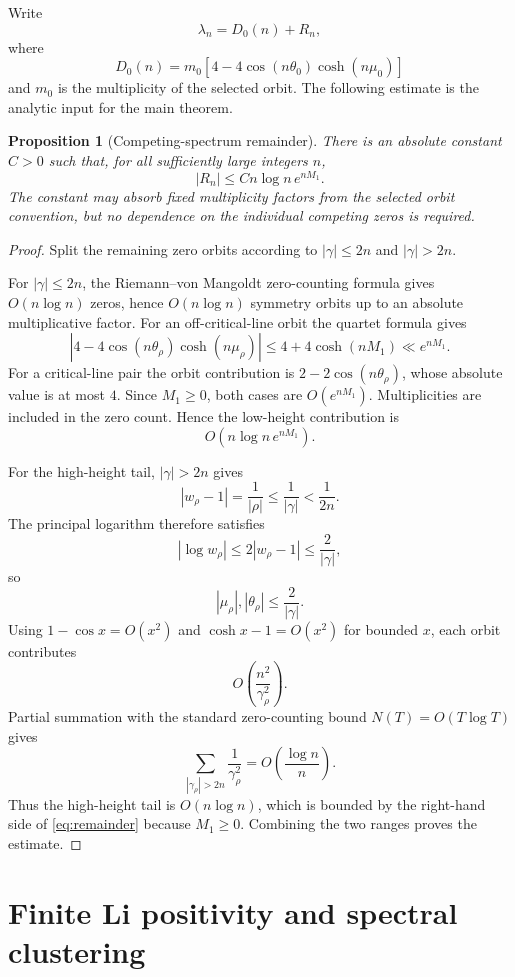 \documentclass[11pt]{article}
\newtheorem{proposition}[theorem]{Proposition}
\newcommand{\Li}{\lambda}
\begin{document}
Write
\[
\Li_n=D_0(n)+R_n,
\]
where
\[
D_0(n)=m_0\left[4-4\cos(n\theta_0)\cosh(n\mu_0)\right]
\]
and \(m_0\) is the multiplicity of the selected orbit. The following estimate is the analytic input for the main theorem.

\begin{proposition}[Competing-spectrum remainder]
\label{prop:remainder}
There is an absolute constant \(C>0\) such that, for all sufficiently large integers \(n\),
\begin{equation}
|R_n|
\le C n\log n\,e^{nM_1}.
\label{eq:remainder}
\end{equation}
The constant may absorb fixed multiplicity factors from the selected orbit convention, but no dependence on the individual competing zeros is required.
\end{proposition}

\begin{proof}
Split the remaining zero orbits according to \(|\gamma|\le2n\) and \(|\gamma|>2n\).

For $|\gamma|\le2n$, the Riemann--von Mangoldt zero-counting formula gives $O(n\log n)$ zeros, hence $O(n\log n)$ symmetry orbits up to an absolute multiplicative factor. For an off-critical-line orbit the quartet formula gives
\[
\left|4-4\cos(n\theta_\rho)\cosh(n\mu_\rho)\right|
\le4+4\cosh(nM_1)
\ll e^{nM_1}.
\]
For a critical-line pair the orbit contribution is $2-2\cos(n\theta_\rho)$, whose absolute value is at most $4$. Since $M_1\ge0$, both cases are $O(e^{nM_1})$. Multiplicities are included in the zero count. Hence the low-height contribution is
\[
O\left(n\log n\,e^{nM_1}\right).
\]

For the high-height tail, \(|\gamma|>2n\) gives
\[
|w_\rho-1|=\frac1{|\rho|}\le\frac1{|\gamma|}<\frac1{2n}.
\]
The principal logarithm therefore satisfies
\[
|\log w_\rho|\le2|w_\rho-1|\le\frac2{|\gamma|},
\]
so
\[
|\mu_\rho|,|\theta_\rho|\le\frac2{|\gamma|}.
\]
Using \(1-\cos x=O(x^2)\) and \(\cosh x-1=O(x^2)\) for bounded \(x\), each orbit contributes
\[
O\left(\frac{n^2}{\gamma_\rho^2}\right).
\]
Partial summation with the standard zero-counting bound \(N(T)=O(T\log T)\) gives
\[
\sum_{|\gamma_\rho|>2n}\frac1{\gamma_\rho^2}
=O\left(\frac{\log n}{n}\right).
\]
Thus the high-height tail is \(O(n\log n)\), which is bounded by the right-hand side of \eqref{eq:remainder} because \(M_1\ge0\). Combining the two ranges proves the estimate.
\end{proof}

\section{Finite Li positivity and spectral clustering}
\end{document}
